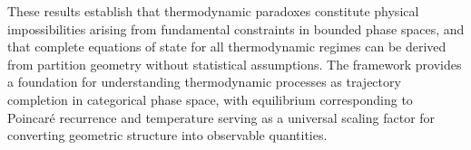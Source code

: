 These results establish that thermodynamic paradoxes constitute physical impossibilities arising from fundamental constraints in bounded phase spaces, and that complete equations of state for all thermodynamic regimes can be derived from partition geometry without statistical assumptions. The framework provides a foundation for understanding thermodynamic processes as trajectory completion in categorical phase space, with equilibrium corresponding to Poincaré recurrence and temperature serving as a universal scaling factor for converting geometric structure into observable quantities.

